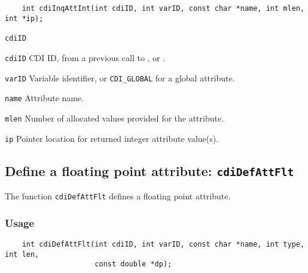 \begin{verbatim}
    int cdiInqAttInt(int cdiID, int varID, const char *name, int mlen, int *ip);
\end{verbatim}

\hspace*{4mm}\begin{minipage}[]{15cm}
\begin{deflist}{\texttt{cdiID}\ }
\item[\texttt{cdiID}]
CDI ID, from a previous call to {}, {} or {}.
\item[\texttt{varID}]
Variable identifier, or {\texttt{CDI\_GLOBAL}} for a global attribute.
\item[\texttt{name}]
Attribute name.
\item[\texttt{mlen}]
Number of allocated values provided for the attribute.
\item[\texttt{ip}]
Pointer location for returned integer attribute value(s).

\end{deflist}
\end{minipage}


\subsection{Define a floating point attribute: \texttt{cdiDefAttFlt}}
\label{cdiDefAttFlt}

The function {\texttt{cdiDefAttFlt}} defines a floating point attribute.

\subsubsection*{Usage}

\begin{verbatim}
    int cdiDefAttFlt(int cdiID, int varID, const char *name, int type, int len, 
                     const double *dp);
\end{verbatim}

